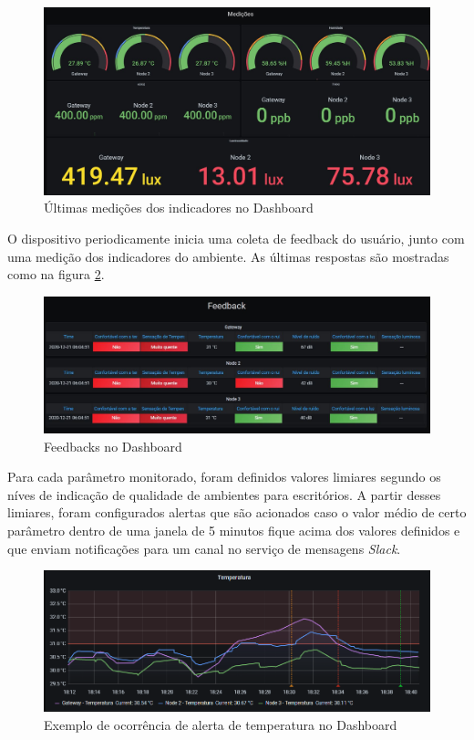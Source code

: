 \documentclass[../monografia.tex]{subfiles}
\begin{document}
\begin{figure}[h]
	\centering
	\includegraphics[width=\textwidth]{dashboard-medicoes}
	\caption{Últimas medições dos indicadores no Dashboard}
	\label{fig:dashboard-medicoes}
\end{figure}

\newpage
O dispositivo periodicamente inicia uma coleta de feedback do usuário, junto com uma medição dos indicadores do ambiente. As últimas respostas são mostradas como na figura \ref{fig:dashboard-feedback}. 

\begin{figure}[h]
	\centering
	\includegraphics[width=\textwidth]{dashboard-feedback}
	\caption{Feedbacks no Dashboard}
	\label{fig:dashboard-feedback}
\end{figure}

Para cada parâmetro monitorado, foram definidos valores limiares segundo os níves de indicação de qualidade de ambientes para escritórios. A partir desses limiares, foram configurados alertas que são acionados caso o valor médio de certo parâmetro dentro de uma janela de 5 minutos fique acima dos valores definidos e que enviam notificações para um canal no serviço de mensagens \textit{Slack}.    

\begin{figure}[h!]
	\centering
	\includegraphics[width=\textwidth]{grafana-temperature-alert.png}
	\caption{Exemplo de ocorrência de alerta de temperatura no Dashboard}
	\label{fig:dashboard-alerta}
\end{figure}
\end{document}
